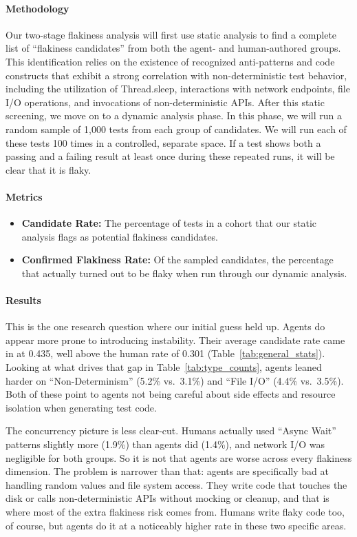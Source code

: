 \documentclass[conference]{IEEEtran}
\begin{document}
\paragraph{\textbf{Methodology}}
Our two-stage flakiness analysis will first use static analysis to find a complete list of ``flakiness candidates'' from both the agent- and human-authored groups.  This identification relies on the existence of recognized anti-patterns and code constructs that exhibit a strong correlation with non-deterministic test behavior, including the utilization of Thread.sleep, interactions with network endpoints, file I/O operations, and invocations of non-deterministic APIs.  After this static screening, we move on to a dynamic analysis phase. In this phase, we will run a random sample of 1,000 tests from each group of candidates.  We will run each of these tests 100 times in a controlled, separate space.  If a test shows both a passing and a failing result at least once during these repeated runs, it will be clear that it is flaky.

\paragraph{\textbf{Metrics}}
\begin{itemize}
    \item \textbf{Candidate Rate:} The percentage of tests in a cohort that our static analysis flags as potential flakiness candidates.
    \item \textbf{Confirmed Flakiness Rate:} Of the sampled candidates, the percentage that actually turned out to be flaky when run through our dynamic analysis.
\end{itemize}
 
\paragraph{\textbf{Results}}
This is the one research question where our initial guess held up. Agents do appear more prone to introducing instability. Their average candidate rate came in at 0.435, well above the human rate of 0.301 (Table~\ref{tab:general_stats}). Looking at what drives that gap in Table~\ref{tab:type_counts}, agents leaned harder on ``Non-Determinism'' (5.2\% vs.\ 3.1\%) and ``File I/O'' (4.4\% vs.\ 3.5\%). Both of these point to agents not being careful about side effects and resource isolation when generating test code.
 
The concurrency picture is less clear-cut. Humans actually used ``Async Wait'' patterns slightly more (1.9\%) than agents did (1.4\%), and network I/O was negligible for both groups. So it is not that agents are worse across every flakiness dimension. The problem is narrower than that: agents are specifically bad at handling random values and file system access. They write code that touches the disk or calls non-deterministic APIs without mocking or cleanup, and that is where most of the extra flakiness risk comes from. Humans write flaky code too, of course, but agents do it at a noticeably higher rate in these two specific areas.
\end{document}

